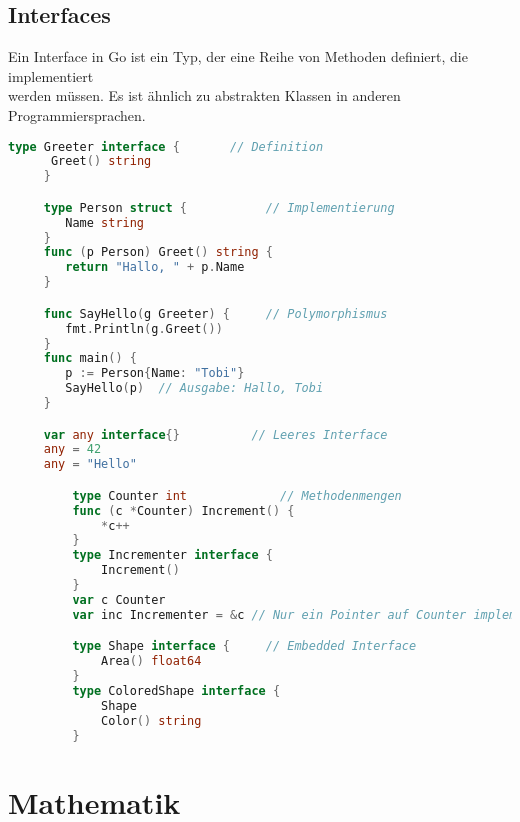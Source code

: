 \documentclass[twoside,a4paper,12pt]{article}
\begin{document}
\newpage
\subsection{Interfaces}
Ein Interface in Go ist ein Typ, der eine Reihe von Methoden definiert, die implementiert \\ 
werden müssen. Es ist ähnlich zu abstrakten Klassen in anderen Programmiersprachen.
\begin{center}
  \begin{minipage}{1.0\textwidth}
    \begin{lstlisting}[language=Go]
     type Greeter interface {       // Definition
      Greet() string
     }

     type Person struct {           // Implementierung
        Name string
     }
     func (p Person) Greet() string {
        return "Hallo, " + p.Name
     }

     func SayHello(g Greeter) {     // Polymorphismus
        fmt.Println(g.Greet())
     }
     func main() {
        p := Person{Name: "Tobi"}
        SayHello(p)  // Ausgabe: Hallo, Tobi
     }

     var any interface{}          // Leeres Interface
     any = 42
     any = "Hello"

		 type Counter int             // Methodenmengen
		 func (c *Counter) Increment() {
		     *c++
		 }
		 type Incrementer interface {
		     Increment()
		 }
		 var c Counter
		 var inc Incrementer = &c // Nur ein Pointer auf Counter implementiert Incrementer

		 type Shape interface {     // Embedded Interface
		     Area() float64
		 }
		 type ColoredShape interface {
		     Shape
		     Color() string
		 }
    \end{lstlisting}
  \end{minipage}
\end{center}

\section{Mathematik}
\end{document}
